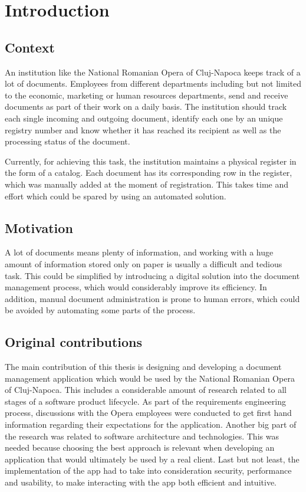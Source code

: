 \chapter{Introduction}
\label{chapter:introduction}

\section{Context}
\label{section:context}

An institution like the National Romanian Opera of Cluj-Napoca keeps track of a lot of documents.
Employees from different departments including but not limited to the economic, marketing or human resources departments, send and receive documents as part of their work on a daily basis. The institution should track each single incoming and outgoing document, identify each one by an unique registry number and know whether it has reached its recipient as well as the processing status of the document.

Currently, for achieving this task, the institution maintains a physical register in the form of a catalog. Each document has its corresponding row in the register, which was manually added at the moment of registration. This takes time and effort which could be spared by using an automated solution.

\section{Motivation}
\label{section:motivation}

A lot of documents means plenty of information, and working with a huge amount of information stored only on paper is usually a difficult and tedious task. This could be simplified by introducing a digital solution into the document management process, which would considerably improve its efficiency. In addition, manual document administration is prone to human errors, which could be avoided by automating some parts of the process.



\section{Original contributions}
\label{section:originalContributions}

The main contribution of this thesis is designing and developing a document management application which would be used by the National Romanian Opera of Cluj-Napoca. This includes a considerable amount of research related to all stages of a software product lifecycle. As part of the requirements engineering process, discussions with the Opera employees were conducted to get first hand information regarding their expectations for the application. Another big part of the research was related to software architecture and technologies. This was needed because choosing the best approach is relevant when developing an application that would ultimately be used by a real client. Last but not least, the implementation of the app had to take into consideration security, performance and usability, to make interacting with the app both efficient and intuitive.

